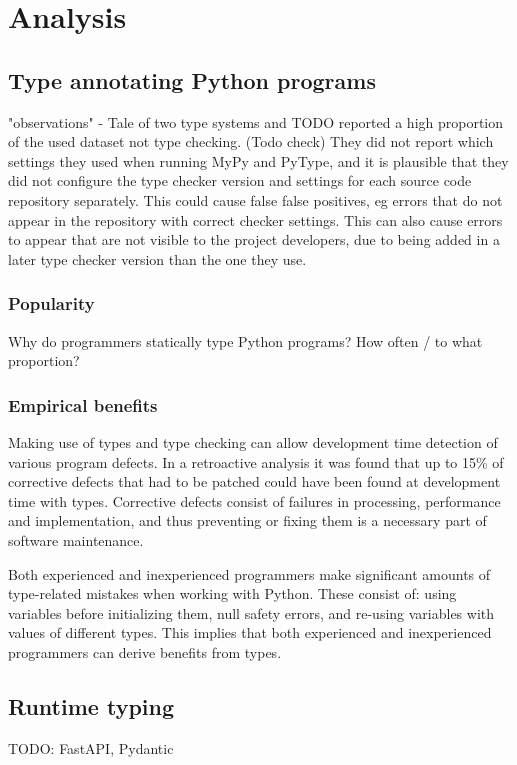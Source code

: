 \chapter{Analysis\label{analysis}}

\section{Type annotating Python programs}

"observations"
- Tale of two type systems and TODO reported a high proportion of the used dataset not type checking. (Todo check) They did not report which settings they used when running MyPy and PyType, and it is plausible that they did not configure the type checker version and settings for each source code repository separately. This could cause false false positives, eg errors that do not appear in the repository with correct checker settings. This can also cause errors to appear that are not visible to the project developers, due to being added in a later type checker version than the one they use. 



\subsection{Popularity}
Why do programmers statically type Python programs? How often / to what proportion?     

\subsection{Empirical benefits}

Making use of types and type checking can allow development time detection of various program defects. In a retroactive analysis it was found that up to 15\% of corrective defects that had to be patched could have been found at development time with types\cite{khan_empirical_2022}. Corrective defects consist of failures in processing, performance and implementation, and thus preventing or fixing them is a necessary part of software maintenance.

Both experienced and inexperienced programmers make significant amounts of type-related mistakes when working with Python\cite{khan_empirical_2022}. These consist of: using variables before initializing them, null safety errors, and re-using variables with values of different types. This implies that both experienced and inexperienced programmers can derive benefits from types.


\section{Runtime typing}
TODO: FastAPI, Pydantic